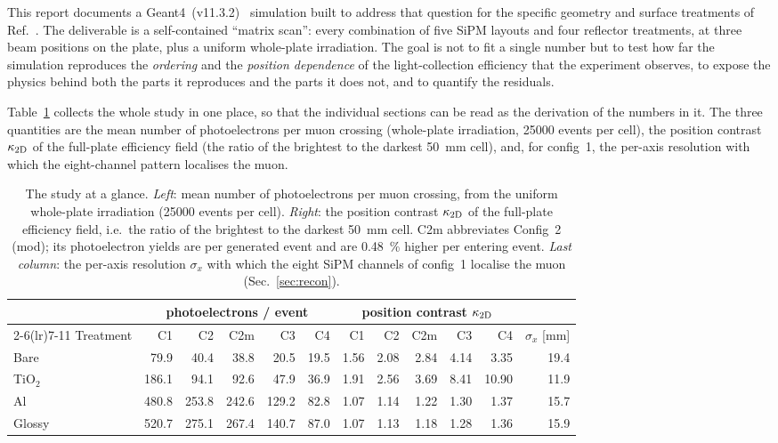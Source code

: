 \documentclass[11pt,a4paper]{article}
\newcommand{\gfour}{Geant4}
\begin{document}
This report documents a \gfour\ (v11.3.2)~\cite{Agostinelli2003,Allison2016}
simulation built to address that question for the specific geometry and
surface treatments of Ref.~\cite{Rao2025}. The deliverable is a
self-contained ``matrix scan'': every combination of five SiPM layouts and
four reflector treatments, at three beam positions on the plate, plus a
uniform whole-plate irradiation. The goal is not to fit a single number but
to test how far the simulation reproduces the \emph{ordering} and the
\emph{position dependence} of the light-collection efficiency that the
experiment observes, to expose the physics behind both the parts it
reproduces and the parts it does not, and to quantify the residuals.

Table~\ref{tab:glance} collects the whole study in one place, so that the
individual sections can be read as the derivation of the numbers in it. The
three quantities are the mean number of photoelectrons per muon crossing
(whole-plate irradiation, \num{25000} events per cell), the position contrast
$\kappa_{\rm 2D}$ of the full-plate efficiency field (the ratio of the
brightest to the darkest \SI{50}{\milli\meter} cell), and, for config~1, the
per-axis resolution with which the eight-channel pattern localises the muon.

\begin{table}[H]
\centering
\caption{The study at a glance. \emph{Left}: mean number of photoelectrons per
muon crossing, from the uniform whole-plate irradiation (\num{25000} events per
cell). \emph{Right}: the position contrast $\kappa_{\rm 2D}$ of the full-plate
efficiency field, i.e.\ the ratio of the brightest to the darkest
\SI{50}{\milli\meter} cell. C2m abbreviates Config~2 (mod); its
photoelectron yields are per generated event and are \SI{0.48}{\percent}
higher per entering event. \emph{Last column}: the per-axis resolution
$\sigma_x$ with which the eight SiPM channels of config~1 localise the muon
(Sec.~\ref{sec:recon}).}
\label{tab:glance}
\small
\setlength{\tabcolsep}{5pt}
\begin{tabular}{@{}lrrrrr|rrrrr|r@{}}
\toprule
 & \multicolumn{5}{c|}{photoelectrons / event} &
   \multicolumn{5}{c}{position contrast $\kappa_{\rm 2D}$} & \\
\cmidrule(lr){2-6}\cmidrule(lr){7-11}
Treatment & C1 & C2 & C2m & C3 & C4 & C1 & C2 & C2m & C3 & C4 & $\sigma_x$ [mm] \\
\midrule
Bare   & 79.9  & 40.4  & 38.8  & 20.5  & 19.5  & 1.56 & 2.08 & 2.84 & 4.14 & 3.35 & 19.4 \\
TiO$_2$ & 186.1 & 94.1  & 92.6  & 47.9  & 36.9  & 1.91 & 2.56 & 3.69 & 8.41 & 10.90 & 11.9 \\
Al     & 480.8 & 253.8 & 242.6 & 129.2 & 82.8  & 1.07 & 1.14 & 1.22 & 1.30 & 1.37 & 15.7 \\
Glossy & 520.7 & 275.1 & 267.4 & 140.7 & 87.0  & 1.07 & 1.13 & 1.18 & 1.28 & 1.36 & 15.9 \\
\bottomrule
\end{tabular}
\end{table}
\end{document}
